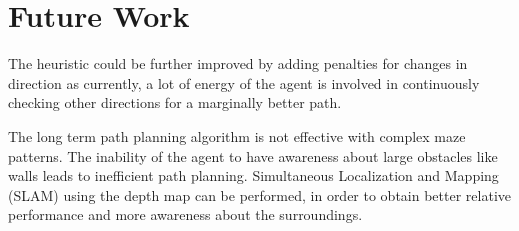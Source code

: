 \section{Future Work}

The heuristic could be further improved by adding penalties for changes in direction as currently, a lot of energy of the agent is involved in continuously checking other directions for a marginally better path. 

The long term path planning algorithm is not effective with complex maze patterns. The inability of the agent to have awareness about large obstacles like walls leads to inefficient path planning. Simultaneous Localization and Mapping (SLAM) using the depth map can be performed, in order to obtain better relative performance and more awareness about the surroundings.